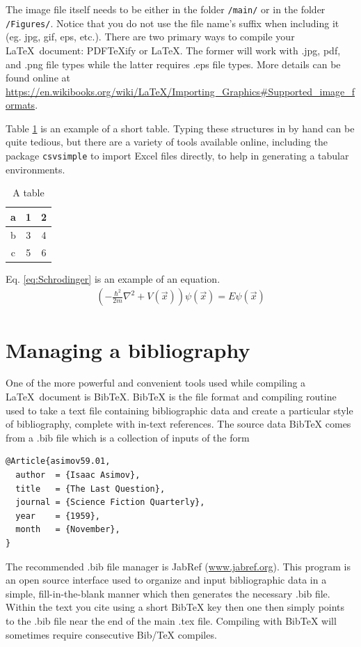 The image file itself needs to be either in the folder \verb|/main/| or in the folder \verb|/Figures/|. Notice that you do not use the file name's suffix when including it (eg. jpg, gif, eps, etc.). There are two primary ways to compile your \LaTeX\ document: PDFTeXify or LaTeX. The former will work with .jpg, pdf, and .png file types while the latter requires .eps file types. More details can be found online at\\
\url{https://en.wikibooks.org/wiki/LaTeX/Importing_Graphics#Supported_image_formats}.

Table \ref{tab:tab1} is an example of a short table. Typing these structures in by hand can be quite tedious, but there are a variety of tools available online, including the package \verb|csvsimple| to import Excel files directly, to help in generating a tabular environments.

\begin{table}[H]
\centering
\begin{tabular}{|c||c|c|}
  \hline
  a  & 1 & 2 \\\hline
  b  & 3 & 4 \\
  c  & 5 & 6 \\
  \hline
\end{tabular}
\caption{A table}
\label{tab:tab1}
\end{table}

Eq. \ref{eq:Schrodinger} is an example of an equation.
\begin{align}
    \left(-\frac{\hbar^2}{2m}\nabla^2+V(\vec{x})\right)\psi(\vec{x}) = E\psi(\vec{x})
    \label{eq:Schrodinger}
\end{align}

\section{Managing a bibliography}

One of the more powerful and convenient tools used while compiling a \LaTeX\ document is BibTeX. BibTeX is the file format and compiling routine used to take a text file containing bibliographic data and create a particular style of bibliography, complete with in-text references. The source data BibTeX comes from a .bib file which is a collection of inputs of the form
\begin{verbatim}
@Article{asimov59.01,
  author  = {Isaac Asimov},
  title   = {The Last Question},
  journal = {Science Fiction Quarterly},
  year    = {1959},
  month   = {November},
}
\end{verbatim}
The recommended .bib file manager is JabRef (\url{www.jabref.org}). This program is an open source interface used to organize and input bibliographic data in a simple, fill-in-the-blank manner which then generates the necessary .bib file. Within the text you cite using a short BibTeX key\cite{asimov59.01} then one then simply points to the .bib file near the end of the main .tex file. Compiling with BibTeX will sometimes require consecutive Bib/TeX compiles.

